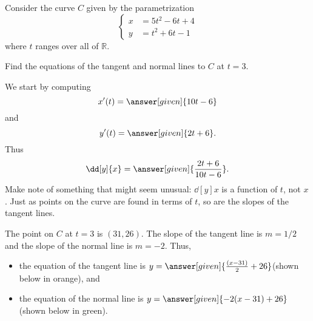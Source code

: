 \documentclass{ximera}
\begin{document}
\begin{example}
Consider the curve $C$ given by the parametrization
\[ 
\begin{cases}
x&=5t^2-6t+4 \\
y&=t^2+6t-1
\end{cases}
\]
where $t$ ranges over all of $\mathbb{R}$. 

 Find the equations of the tangent and normal lines
  to $C$ at $t=3$.
  \begin{explanation}
    We start by computing
    \[
    x'(t) = \answer[given]{10t-6}
    \]
    and
    \[
    y'(t) =\answer[given]{2t+6}.
    \]
    Thus
    \[
    \dd[y]{x} = \answer[given]{\frac{2t+6}{10t-6}}.
    \]
    Make note of something that might seem unusual: $\dd[y]{x}$ is a
    function of $t$, not $x$. Just as points on the curve are found in
    terms of $t$, so are the slopes of the tangent lines.
		
    The point on $C$ at $t=3$ is $(31,26)$. The slope of the tangent
    line is $m=1/2$ and the slope of the normal line is $m=-2$. Thus,
    \begin{itemize}
    \item the equation of the tangent line is
      $y=\answer[given]{\frac{(x-31)}{2}+26}$(shown below in orange), and
    \item the equation of the normal line is
      $y=\answer[given]{-2(x-31)+26}$(shown below in green).
    \end{itemize}
  \end{explanation}


\begin{image}
\end{image}



\end{example}
\end{document}
